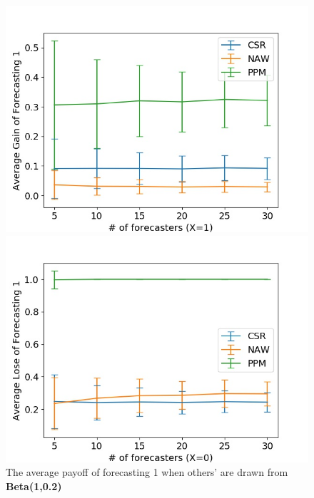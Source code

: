 \documentclass[english,10pt]{article}
\begin{document}
\begin{enumerate}
	\begin{figure}[H]
        	\centering
        	\begin{minipage}{0.48\textwidth}
        	\includegraphics[width = \textwidth]{Ind(Beta(1_0dot2)F_UnifW)Avg_gain_of_forecasting_1.jpg}
        	\end{minipage}
        	\begin{minipage}{0.48\textwidth}
        	\includegraphics[width = \textwidth]{Ind(Beta(1_0dot2)F_UnifW)Avg_lose_of_forecasting_1.jpg}
        	\end{minipage}
        	\caption{The  average payoff of forecasting 1 when others' are drawn from \textbf{Beta(1,0.2)}}
        	\end{figure}
	

\end{enumerate}
\end{document}

